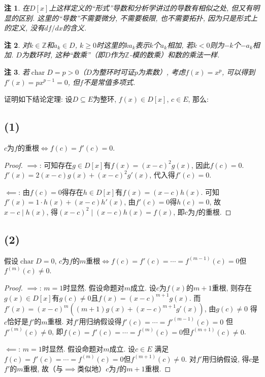 \documentclass[12pt, a4paper, fontset=windows]{ctexart}
\newcommand{\Z}{\mathbb{Z}}
\newcommand{\ch}{\operatorname{char}}
\newcommand{\kh}[1]{（{#1}）} %
\newcommand{\yh}[1]{“{#1}”} %
\newtheorem*{remark}{注}
\begin{document}
\begin{remark}
在$D[x]$上这样定义的\yh{形式}导数和分析学讲过的导数有相似之处, 
但又有明显的区别. 这里的\yh{导数}不需要微分, 不需要极限, 
也不需要拓扑, 因为只是形式上的定义, 没有$df/dx$的含义. 
\end{remark}

\begin{remark}
对$k\in\Z$和$a_k\in D$, $k\ge 0$时这里的$ka_k$表示$k$个$a_k$相加, 
若$k<0$则为$-k$个$-a_k$相加. $D$为数环时, 这种\yh{数乘}\kh{即$D$作为$\Z$-模的数乘}和数的乘法一样. 
\end{remark}

\begin{remark}
若$\ch D=p>0$\kh{$D$为整环时可证$p$为素数}, 
考虑$f(x)=x^p$, 可以得到$f'(x)=px^{p-1}=0$, 但$f$不是常值多项式. 
\end{remark}

\vspace{2em}

证明如下结论定理: 设$D\subseteq E$为整环, $f(x)\in D[x]$, 
$c\in E$, 那么: 
\subsection*{(1)}

$c$为$f$的重根$\iff f(c)=f'(c)=0$. 

\begin{proof}
$\implies$: 可知存在$g\in D[x]$有$f(x)=(x-c)^2g(x)$, 
因此$f(c)=0$. $f'(x)=2(x-c)g(x)+(x-c)^2g'(x)$, 代入得$f'(c)=0$. 

$\impliedby$: 由$f(c)=0$得存在$h\in D[x]$有$f(x)=(x-c)h(x)$. 
可知$f'(x)=1\cdot h(x)+(x-c)h'(x)$, 由$f'(c)=0$得$h(c)=0$, 
故$x-c\mid h(x)$, 得$(x-c)^2\mid(x-c)h(x)=f(x)$, 即$c$为$f$的重根. 
\end{proof}

\subsection*{(2)}

假设$\ch D=0$, $c$为$f$的$m$重根$\iff f(c)=f'(c)=\cdots=f^{(m-1)}(c)=0$但$f^{(m)}(c)\ne 0$. 

\begin{proof}
$\implies$: $m=1$时显然. 假设命题对$m$成立. 设$c$为$f(x)$的$m+1$重根, 
则存在$g(x)\in D[x]$有$g(c)\ne 0$且$f(x)=(x-c)^{m+1}g(x)$. 
而$f'(x)=(x-c)^m((m+1)g(x)+(x-c)^{m+1}g'(x))$, 由$g(c)\ne 0$
得$c$恰好是$f'$的$m$重根. 对$f'$用归纳假设得$f'(c)=\cdots=f'^{(m-1)}(c)=0$
但$f'^{(m)}(c)\ne 0$, 即$f(c)=f'(c)=\cdots=f^{(m)}(c)=0$但$f^{(m+1)}(c)\ne 0$. 

$\impliedby$: $m=1$时显然. 假设命题对$m$成立. 设$c\in E$
满足$f(c)=f'(c)=\cdots=f^{(m)}(c)=0$但$f^{(m+1)}(c)\ne 0$. 
对$f'$用归纳假设, 得$c$是$f'$的$m$重根, 
故\kh{与$\implies$类似地}$c$为$f$的$m+1$重根. 
\end{proof}
\end{document}
